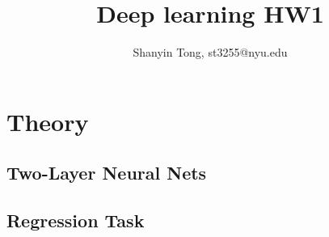 \documentclass[10pt,a4paper]{article}
\theoremstyle{dotlessP}
\begin{document}
\title{Deep learning HW1}
\author{Shanyin Tong, st3255@nyu.edu}

\maketitle


\section{Theory}
\subsection{Two-Layer Neural Nets}
\subsection{Regression Task}
\end{document}
